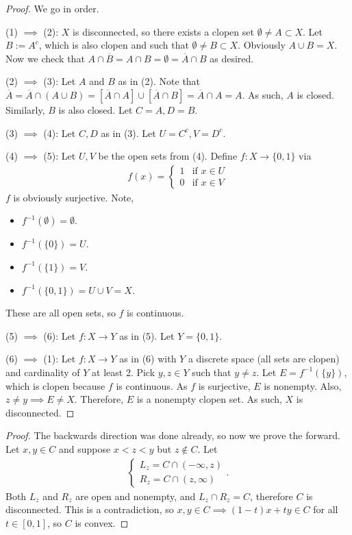 \documentclass{report}
\begin{document}
\begin{proof}
    We go in order.

    (1) $\implies$ (2): $X$ is disconnected, so there exists a clopen set $\emptyset \neq A \subset X$. Let $B := A^c$, which is also clopen and such that $\emptyset \neq B \subset X$. Obviously $A \cup B = X$. Now we check that $A \cap \overline B = A \cap B = \emptyset = \overline A \cap B$ as desired.

    (2) $\implies$ (3): Let $A$ and $B$ as in (2). Note that $\overline A = \overline A \cap (A \cup B) = [\overline A \cap A] \cup [\overline A \cap B] = \overline A \cap A = A$. As such, $A$ is closed. Similarly, $B$ is also closed. Let $C = A, D = B$.

    (3) $\implies$ (4): Let $C, D$ as in (3). Let $U = C^c, V = D^c$.

    (4) $\implies$ (5): Let $U,V$ be the open sets from (4). Define $f: X \to \{0, 1\}$ via
    \begin{align*}
        f(x) = \begin{cases}
            1 & \text{if } x \in U \\
            0 & \text{if } x \in V
        \end{cases}
    \end{align*}
    $f$ is obviously surjective. Note,
    \begin{itemize}
        \item $f^{-1}(\emptyset) = \emptyset$.
        \item $f^{-1}(\{0\}) = U$.
        \item $f^{-1}(\{1\}) = V$.
        \item $f^{-1}(\{0, 1\}) = U \cup V = X$.
    \end{itemize}
    These are all open sets, so $f$ is continuous.

    (5) $\implies$ (6): Let $f: X \to Y$ as in (5). Let $Y = \{0, 1\}$. 

    (6) $\implies$ (1): Let $f: X \to Y$ as in (6) with $Y$ a discrete space (all sets are clopen) and cardinality of $Y$ at least 2. Pick $y , z \in Y$ such that $y \neq z$. Let $E = f^{-1}(\{y\})$, which is clopen because $f$ is continuous. As $f$ is surjective, $E$ is nonempty. Also, $z \neq y \implies E \neq X$. Therefore, $E$ is a nonempty clopen set. As such, $X$ is disconnected.
\end{proof}
\begin{proof}
    The backwards direction was done already, so now we prove the forward. Let $x, y \in C$ and suppose $x < z < y$ but $z \notin C$. Let 
    \begin{align*}
        \begin{cases} L_z = C \cap (-\infty, z) \\ R_z = C \cap (z, \infty) \end{cases}.
    \end{align*}
    Both $L_z$ and $R_z$ are open and nonempty, and $L_z \cap R_z = C$, therefore $C$ is disconnected. This is a contradiction, so $x,y \in C \implies (1-t)x + ty \in C$ for all $t \in [0, 1]$, so $C$ is convex.
\end{proof}
\end{document}
